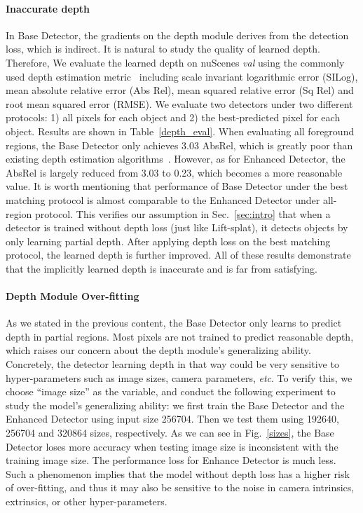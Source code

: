 \documentclass[twocolumn,letterpaper]{article}
\begin{document}
\paragraph{Inaccurate depth} In Base Detector, the gradients on the depth module derives from the detection loss, which is indirect. It is natural to study the quality of learned depth. Therefore, We evaluate the learned depth  on nuScenes \emph{val} using the commonly used depth estimation metric~\cite{deptheval} including scale invariant logarithmic error (SILog), mean absolute relative error (Abs Rel), mean squared relative error (Sq Rel) and root mean squared error (RMSE). We evaluate two detectors under two different protocols: 1) all pixels for each object and 2) the best-predicted pixel for each object. Results are shown in Table~\ref{depth_eval}. When evaluating all foreground regions, the Base Detector only achieves 3.03 AbsRel, which is greatly poor than existing depth estimation algorithms~\cite{li2022depthformer,  bhat2021adabins}. However, as for Enhanced Detector, the AbsRel is largely reduced from 3.03 to 0.23, which becomes a more reasonable value. It is worth mentioning that performance of Base Detector under the best matching protocol is almost comparable to the Enhanced Detector under all-region protocol. This verifies our assumption in Sec.~\ref{sec:intro} that when a detector is trained without depth loss (just like Lift-splat), it detects objects by only learning partial depth. After applying depth loss on the best matching protocol, the learned depth is further improved. All of these results demonstrate that the implicitly learned depth is inaccurate and is far from satisfying.

\paragraph{Depth Module Over-fitting} As we stated in the previous content, the Base Detector only learns to predict depth in partial regions. Most pixels are not trained to predict reasonable depth, which raises our concern about the depth module's generalizing ability. Concretely, the detector learning depth in that way could be very sensitive to hyper-parameters such as image sizes, camera parameters, \emph{etc}. To verify this, we choose ``image size'' as the variable, and conduct the following experiment to study the model's generalizing ability: we first train the Base Detector and the Enhanced Detector using input size 256704. Then we test them using 192640, 256704 and 320864 sizes, respectively. As we can see in Fig.~\ref{sizes}, the Base Detector loses more accuracy when testing image size is inconsistent with the training image size. The performance loss for Enhance Detector is much less. Such a phenomenon implies that the model without depth loss has a higher risk of over-fitting, and thus it may also be sensitive to the noise in camera intrinsics, extrinsics, or other hyper-parameters. 
\end{document}
